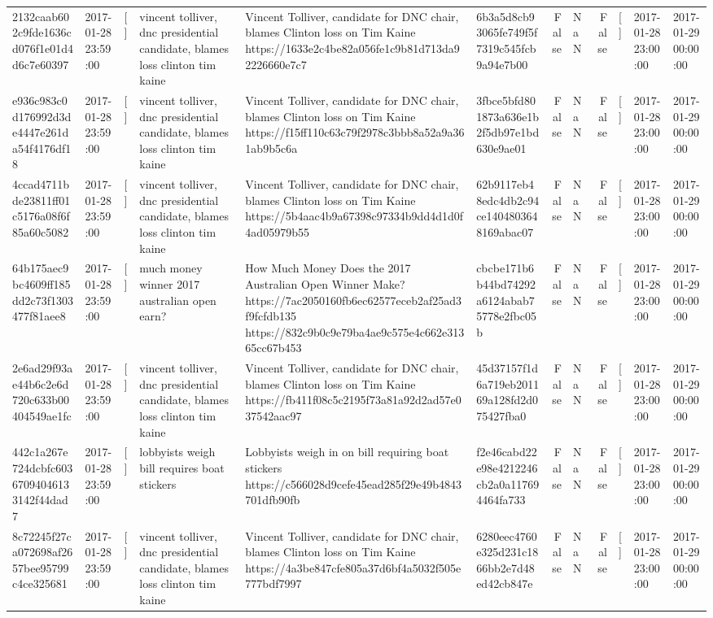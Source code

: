 \begin{tabular}{llllllrlrlll}
2132caab602c9fde1636cd076f1e01d4d6c7e60397 & 2017-01-28 23:59:00 & [] & vincent tolliver, dnc presidential candidate, blames loss clinton tim kaine & Vincent Tolliver, candidate for DNC chair, blames Clinton loss on Tim Kaine https://1633e2c4be82a056fe1c9b81d713da92226660e7c7 & 6b3a5d8cb93065fe749f5f7319c545fcb9a94e7b00 & False & NaN & False & [] & 2017-01-28 23:00:00 & 2017-01-29 00:00:00 \\
e936c983c0d176992d3de4447e261da54f4176df18 & 2017-01-28 23:59:00 & [] & vincent tolliver, dnc presidential candidate, blames loss clinton tim kaine & Vincent Tolliver, candidate for DNC chair, blames Clinton loss on Tim Kaine https://f15ff110c63c79f2978c3bbb8a52a9a361ab9b5c6a & 3fbce5bfd801873a636e1b2f5db97e1bd630e9ae01 & False & NaN & False & [] & 2017-01-28 23:00:00 & 2017-01-29 00:00:00 \\
4ccad4711bde23811ff01c5176a08f6f85a60c5082 & 2017-01-28 23:59:00 & [] & vincent tolliver, dnc presidential candidate, blames loss clinton tim kaine & Vincent Tolliver, candidate for DNC chair, blames Clinton loss on Tim Kaine https://5b4aac4b9a67398c97334b9dd4d1d0f4ad05979b55 & 62b9117eb48edc4db2c94ce1404803648169abac07 & False & NaN & False & [] & 2017-01-28 23:00:00 & 2017-01-29 00:00:00 \\
64b175aec9bc4609ff185dd2c73f1303477f81aee8 & 2017-01-28 23:59:00 & [] & much money winner 2017 australian open earn? & How Much Money Does the 2017 Australian Open Winner Make? https://7ac2050160fb6ec62577eceb2af25ad3f9fcfdb135 https://832c9b0c9e79ba4ae9c575e4c662e31365cc67b453 & cbcbe171b6b44bd74292a6124abab75778e2fbc05b & False & NaN & False & [] & 2017-01-28 23:00:00 & 2017-01-29 00:00:00 \\
2e6ad29f93ae44b6c2e6d720c633b00404549ae1fc & 2017-01-28 23:59:00 & [] & vincent tolliver, dnc presidential candidate, blames loss clinton tim kaine & Vincent Tolliver, candidate for DNC chair, blames Clinton loss on Tim Kaine https://fb411f08c5c2195f73a81a92d2ad57e037542aac97 & 45d37157f1d6a719eb201169a128fd2d075427fba0 & False & NaN & False & [] & 2017-01-28 23:00:00 & 2017-01-29 00:00:00 \\
442c1a267e724dcbfc60367094046133142f44dad7 & 2017-01-28 23:59:00 & [] & lobbyists weigh bill requires boat stickers & Lobbyists weigh in on bill requiring boat stickers https://c566028d9cefe45ead285f29e49b4843701dfb90fb & f2e46cabd22e98e4212246cb2a0a117694464fa733 & False & NaN & False & [] & 2017-01-28 23:00:00 & 2017-01-29 00:00:00 \\
8c72245f27ca072698af2657bee95799c4ce325681 & 2017-01-28 23:59:00 & [] & vincent tolliver, dnc presidential candidate, blames loss clinton tim kaine & Vincent Tolliver, candidate for DNC chair, blames Clinton loss on Tim Kaine https://4a3be847cfe805a37d6bf4a5032f505e777bdf7997 & 6280eec4760e325d231c1866bb2e7d48ed42cb847e & False & NaN & False & [] & 2017-01-28 23:00:00 & 2017-01-29 00:00:00 \\

\end{tabular}
